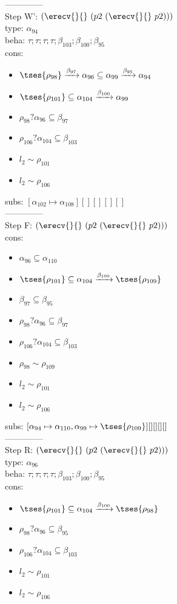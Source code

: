 \documentclass[12pt]{article}
\begin{document}
  --------------\\ 
Step W': $ (\erecv{}{}~(p2~(\erecv{}{}~p2))) $\\
  type: $ \alpha_{94} $ 
\\  beha: $ \tau; \tau; \tau; \tau; \beta_{103}; \beta_{100}; \beta_{95} $ 
\\  cons: \begin{itemize}
\item $  \tses{ \rho_{98}} \xrightarrow{\beta_{97}} \alpha_{96} \subseteq \alpha_{99} \xrightarrow{\beta_{95}} \alpha_{94} $
\item $  \tses{ \rho_{101}} \subseteq \alpha_{104} \xrightarrow{\beta_{100}} \alpha_{99} $
\item $ \rho_{98}?\alpha_{96} \subseteq \beta_{97} $
\item $ \rho_{106}?\alpha_{104} \subseteq \beta_{103} $
\item $ l_{2} \sim\rho_{101} $
\item $ l_{2} \sim\rho_{106} $
\end{itemize} 
  subs:  $ [ \alpha_{102}\mapsto\alpha_{108}] [] [] [] [] $  
 \\--------------\\ 
Step F: $ (\erecv{}{}~(p2~(\erecv{}{}~p2))) $
 \\ cons: \begin{itemize}
\item $ \alpha_{96} \subseteq \alpha_{110} $
\item $  \tses{ \rho_{101}} \subseteq \alpha_{104} \xrightarrow{\beta_{100}}  \tses{ \rho_{109}} $
\item $ \beta_{97} \subseteq \beta_{95} $
\item $ \rho_{98}?\alpha_{96} \subseteq \beta_{97} $
\item $ \rho_{106}?\alpha_{104} \subseteq \beta_{103} $
\item $ \rho_{98} \sim\rho_{109} $
\item $ l_{2} \sim\rho_{101} $
\item $ l_{2} \sim\rho_{106} $
\end{itemize}
 subs:  $ [ \alpha_{94}\mapsto\alpha_{110}, \alpha_{99}\mapsto \tses{ \rho_{109}}] [] [] [] [] $ 
  \\--------------\\ 
Step R: $ (\erecv{}{}~(p2~(\erecv{}{}~p2))) $\\
  type: $ \alpha_{96} $ 
\\  beha: $ \tau; \tau; \tau; \tau; \beta_{103}; \beta_{100}; \beta_{95} $ 
\\  cons: \begin{itemize}
\item $  \tses{ \rho_{101}} \subseteq \alpha_{104} \xrightarrow{\beta_{100}}  \tses{ \rho_{98}} $
\item $ \rho_{98}?\alpha_{96} \subseteq \beta_{95} $
\item $ \rho_{106}?\alpha_{104} \subseteq \beta_{103} $
\item $ l_{2} \sim\rho_{101} $
\item $ l_{2} \sim\rho_{106} $
\end{itemize} 
\end{document}
